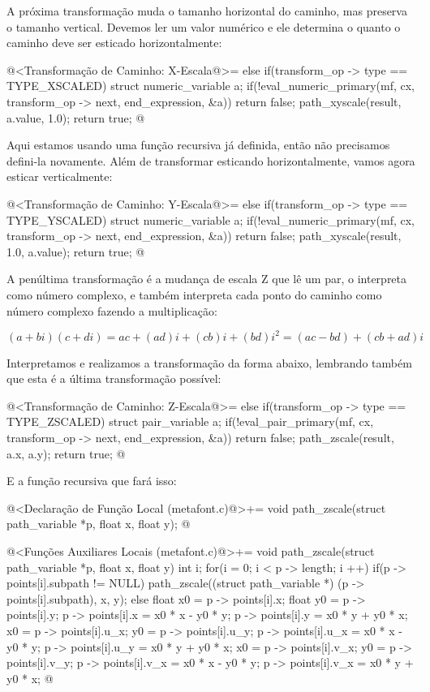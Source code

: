 {A próxima transformação muda o tamanho horizontal do caminho, mas
preserva o tamanho vertical. Devemos ler um valor numérico e ele
determina o quanto o caminho deve ser esticado horizontalmente:


\iniciocodigo
@<Transformação de Caminho: X-Escala@>=
else if(transform_op -> type == TYPE_XSCALED){
  struct numeric_variable a;
  if(!eval_numeric_primary(mf, cx, transform_op -> next, end_expression,
                           &a))
    return false;
  path_xyscale(result, a.value, 1.0);  
  return true;
}
@
\fimcodigo

Aqui estamos usando uma função recursiva já definida, então não
precisamos defini-la novamente. Além de transformar esticando
horizontalmente, vamos agora esticar verticalmente:

\iniciocodigo
@<Transformação de Caminho: Y-Escala@>=
else if(transform_op -> type == TYPE_YSCALED){
  struct numeric_variable a;
  if(!eval_numeric_primary(mf, cx, transform_op -> next, end_expression,
                           &a))
    return false;
  path_xyscale(result, 1.0, a.value);  
  return true;
}
@
\fimcodigo

A penúltima transformação é a mudança de escala Z que lê um par, o
interpreta como número complexo, e também interpreta cada ponto do
caminho como número complexo fazendo a multiplicação:

$$
(a+bi)(c+di) = ac + (ad)i + (cb)i + (bd)i^2 = (ac - bd) + (cb+ad)i
$$

Interpretamos e realizamos a transformação da forma abaixo, lembrando
também que esta é a última transformação possível:

\iniciocodigo
@<Transformação de Caminho: Z-Escala@>=
else if(transform_op -> type == TYPE_ZSCALED){
  struct pair_variable a;
  if(!eval_pair_primary(mf, cx, transform_op -> next, end_expression, &a))
    return false;
  path_zscale(result, a.x, a.y);  
  return true;
}
@
\fimcodigo

E a função recursiva que fará isso:

\iniciocodigo
@<Declaração de Função Local (metafont.c)@>+=
void path_zscale(struct path_variable *p, float x, float y);
@
\fimcodigo

\iniciocodigo
@<Funções Auxiliares Locais (metafont.c)@>+=
void path_zscale(struct path_variable *p, float x, float y){
  int i;
  for(i = 0; i < p -> length; i ++){
    if(p -> points[i].subpath != NULL)
      path_zscale((struct path_variable *) (p -> points[i].subpath),
                  x, y);
    else{
      float x0 = p -> points[i].x;
      float y0 = p -> points[i].y;
      p -> points[i].x = x0 * x - y0 * y;
      p -> points[i].y = x0 * y + y0 * x;
      x0 = p -> points[i].u_x;
      y0 = p -> points[i].u_y;
      p -> points[i].u_x = x0 * x - y0 * y;
      p -> points[i].u_y = x0 * y + y0 * x;
      x0 = p -> points[i].v_x;
      y0 = p -> points[i].v_y;
      p -> points[i].v_x = x0 * x - y0 * y;
      p -> points[i].v_x = x0 * y + y0 * x;
    }
  }
}
@
\fimcodigo

}
